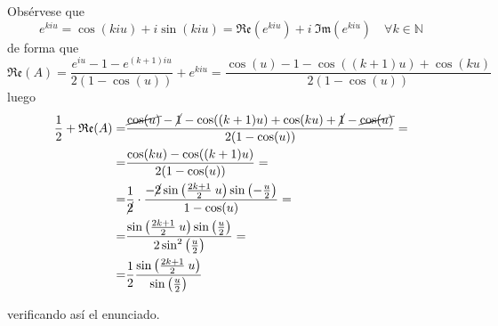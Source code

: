 \begin{enumerate}
\begin{sol}
     Obsérvese que 
     $$e^{kiu}=\cos(kiu)+i\sin(kiu)=\mathfrak{R}\mathfrak{e}(e^{kiu})+i\: \mathfrak{I}\mathfrak{m}(e^{kiu}) \quad \forall k \in \mathbb N$$
     de forma que
     $$\mathfrak{R}\mathfrak{e}(A)=\dfrac{e^{iu}-1-e^{(k+1)iu}}{2(1-\cos(u))} + e^{kiu}=\dfrac{\cos(u)-1-\cos((k+1)u)+\cos(ku)}{2(1-\cos(u))}$$
     luego 
     \begin{equation*}
     \begin{split}\dfrac{1}{2}+\mathfrak{R}\mathfrak{e}(A)=&\dfrac{\cancel{\cos(u)}-\cancel{1}-\cos((k+1)u)+\cos(ku)+\cancel{1}-\cancel{\cos(u)}}{2(1-\cos(u))}=\\=&\dfrac{\cos(ku)-\cos((k+1)u)}{2(1-\cos(u))}=\\=& \dfrac{1}{\cancel{2}}\cdot \dfrac{-\cancel{2}\sin\left(\frac{2k+1}{2} \: u \right)\sin\left(-\frac{u}{2} \right)}{1-\cos(u)}=\\=&  \dfrac{\sin\left(\frac{2k+1}{2} \: u \right)\sin\left(\frac{u}{2} \right)}{2\sin^2\left(\frac{u}{2} \right)} =\\=&\dfrac{1}{2} \dfrac{\sin\left(\frac{2k+1}{2} \: u \right)}{\sin\left(\frac{u}{2} \right)}
     \end{split}\end{equation*}
    \end{sol}
    verificando así el enunciado.
\end{enumerate}